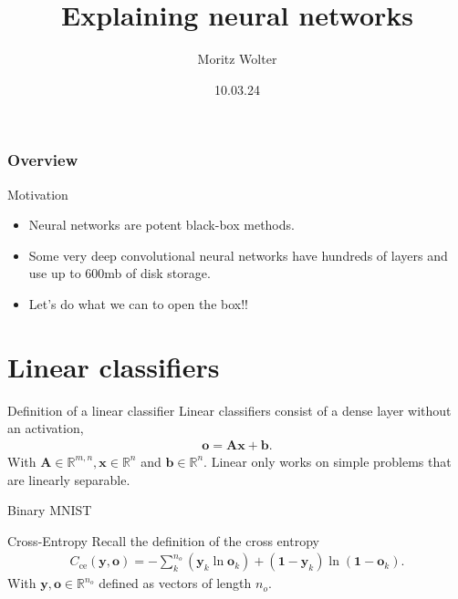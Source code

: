 \documentclass{beamer}
\title{Explaining neural networks}
\date{10.03.24}
\institute{High-Performance Computing and Analytics Lab}
\author{Moritz Wolter}
\begin{document}
    \maketitle

    \begin{frame}
    \frametitle{Overview} 
    \tableofcontents
    \end{frame}

    \begin{frame}{Motivation}
      \begin{itemize}
        \item Neural networks are potent black-box methods.
        \item Some very deep convolutional neural networks have hundreds of layers and use up to 600mb of disk storage.
        \item Let's do what we can to open the box!!
      \end{itemize}
    \end{frame}

    \section{Linear classifiers}
    \begin{frame}{Definition of a linear classifier}
      Linear classifiers consist of a dense layer without an activation,
      \begin{align}
        \mathbf{o} = \mathbf{A}\mathbf{x} + \mathbf{b}.
      \end{align}
      With $\mathbf{A} \in \mathbb{R}^{m,n}, \mathbf{x} \in \mathbb{R}^{n}$ and $\mathbf{b} \in \mathbb{R}^{n}$.
      Linear only works on simple problems that are linearly separable.
    \end{frame}

    \begin{frame}{Binary MNIST}
      \begin{figure}
        
        
      \end{figure}
    \end{frame}

    \begin{frame}{Cross-Entropy}
      Recall the definition of the cross entropy
      \begin{align}
        C_{\text{ce}}(\mathbf{y}, \mathbf{o}) = -\sum_k^{n_o} ( \mathbf{y}_k  \ln \mathbf{o}_k) 
                                   + (\mathbf{1} - \mathbf{y}_k)
                                      \ln(\mathbf{1} - \mathbf{o}_k).
       \end{align}
       With $\mathbf{y},\mathbf{o} \in \mathbb{R}^{n_o}$ defined as vectors of length $n_o$.
    \end{frame}
\end{document}
